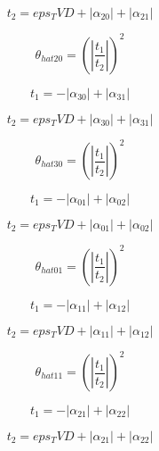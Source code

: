 \documentclass{article}
\begin{document}
\begin{dmath}t_{2} = eps_TVD + \left|{\alpha_{20}}\right| + \left|{\alpha_{21}}\right|\end{dmath}

\begin{dmath}\theta_{hat 20} = \left(\left|{\frac{t_{1}}{t_{2}}}\right| \right)^{2}\end{dmath}

\begin{dmath}t_{1} = - \left|{\alpha_{30}}\right| + \left|{\alpha_{31}}\right|\end{dmath}

\begin{dmath}t_{2} = eps_TVD + \left|{\alpha_{30}}\right| + \left|{\alpha_{31}}\right|\end{dmath}

\begin{dmath}\theta_{hat 30} = \left(\left|{\frac{t_{1}}{t_{2}}}\right| \right)^{2}\end{dmath}

\begin{dmath}t_{1} = - \left|{\alpha_{01}}\right| + \left|{\alpha_{02}}\right|\end{dmath}

\begin{dmath}t_{2} = eps_TVD + \left|{\alpha_{01}}\right| + \left|{\alpha_{02}}\right|\end{dmath}

\begin{dmath}\theta_{hat 01} = \left(\left|{\frac{t_{1}}{t_{2}}}\right| \right)^{2}\end{dmath}

\begin{dmath}t_{1} = - \left|{\alpha_{11}}\right| + \left|{\alpha_{12}}\right|\end{dmath}

\begin{dmath}t_{2} = eps_TVD + \left|{\alpha_{11}}\right| + \left|{\alpha_{12}}\right|\end{dmath}

\begin{dmath}\theta_{hat 11} = \left(\left|{\frac{t_{1}}{t_{2}}}\right| \right)^{2}\end{dmath}

\begin{dmath}t_{1} = - \left|{\alpha_{21}}\right| + \left|{\alpha_{22}}\right|\end{dmath}

\begin{dmath}t_{2} = eps_TVD + \left|{\alpha_{21}}\right| + \left|{\alpha_{22}}\right|\end{dmath}
\end{document}
